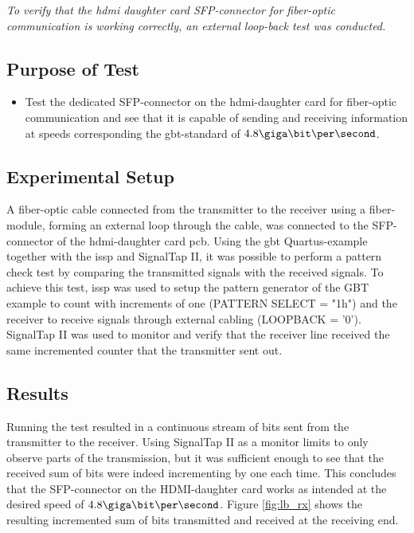 \documentclass[main.tex]{subfiles}
\begin{document}
\textit{To verify that the \gls{hdmi} daughter card SFP-connector for fiber-optic communication is working correctly, an external loop-back test was conducted.}

\subsection{Purpose of Test}
\begin{itemize}\setlength{\itemsep}{10pt}

\item Test the dedicated SFP-connector on the \gls{hdmi}-daughter card for fiber-optic communication and see that it is capable of sending and receiving information at speeds corresponding the \gls{gbt}-standard of $4.8 \giga\bit\per\second$. 
\end{itemize}

\subsection{Experimental Setup}
A fiber-optic cable connected from the transmitter to the receiver using a fiber-module, forming an external loop through the cable, was connected to the SFP-connector of the \gls{hdmi}-daughter card \gls{pcb}. Using the \gls{gbt} Quartus-example together with the \gls{issp} and SignalTap II, it was possible to perform a pattern check test by comparing the transmitted signals with the received signals. To achieve this test, \gls{issp} was used to setup the pattern generator of the GBT example to count with increments of one (PATTERN SELECT = "1h") and the receiver to receive signals through external cabling (LOOPBACK = '0'). SignalTap II was used to monitor and verify that the receiver line received the same incremented counter that the transmitter sent out.

\subsection{Results}
Running the test resulted in a continuous stream of bits sent from the transmitter to the receiver. Using SignalTap II as a monitor limits to only observe parts of the transmission, but it was sufficient enough to see that the received sum of bits were indeed incrementing by one each time. This concludes that the SFP-connector on the HDMI-daughter card works as intended at the desired speed of $4.8 \giga\bit\per\second$. Figure \ref{fig:lb_rx} shows the resulting incremented sum of bits transmitted and received at the receiving end.
\end{document}

